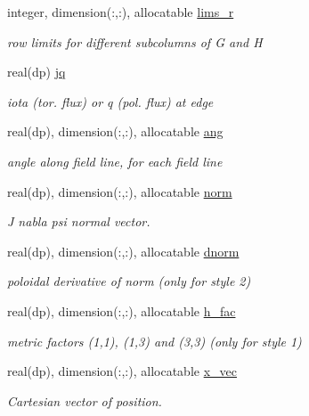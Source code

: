 \begin{DoxyCompactItemize}
integer, dimension(\+:,\+:), allocatable \hyperlink{structvac__vars_1_1vac__type_aac146dc17760b97ff3cb7966cd1b41f9}{lims\+\_\+r}
\begin{DoxyCompactList}\small\item\em row limits for different subcolumns of G and H \end{DoxyCompactList}\item 
real(dp) \hyperlink{structvac__vars_1_1vac__type_a8cba6ae0e61249966161e44ab1c465fb}{jq}
\begin{DoxyCompactList}\small\item\em iota (tor. flux) or q (pol. flux) at edge \end{DoxyCompactList}\item 
real(dp), dimension(\+:,\+:), allocatable \hyperlink{structvac__vars_1_1vac__type_a8a79c1f2b383fda22b5f3cca1f7afd31}{ang}
\begin{DoxyCompactList}\small\item\em angle along field line, for each field line \end{DoxyCompactList}\item 
real(dp), dimension(\+:,\+:), allocatable \hyperlink{structvac__vars_1_1vac__type_a0a50780974a5360abbc019e2e32f82ec}{norm}
\begin{DoxyCompactList}\small\item\em J nabla psi normal vector. \end{DoxyCompactList}\item 
real(dp), dimension(\+:,\+:), allocatable \hyperlink{structvac__vars_1_1vac__type_a7703921b8900d9886904fd51e8cba073}{dnorm}
\begin{DoxyCompactList}\small\item\em poloidal derivative of norm (only for style 2) \end{DoxyCompactList}\item 
real(dp), dimension(\+:,\+:), allocatable \hyperlink{structvac__vars_1_1vac__type_abdbf97da81162577af6880aba4e44061}{h\+\_\+fac}
\begin{DoxyCompactList}\small\item\em metric factors (1,1), (1,3) and (3,3) (only for style 1) \end{DoxyCompactList}\item 
real(dp), dimension(\+:,\+:), allocatable \hyperlink{structvac__vars_1_1vac__type_ae485365ab16528f580d33805ba4633d3}{x\+\_\+vec}
\begin{DoxyCompactList}\small\item\em Cartesian vector of position. \end{DoxyCompactList}\item 

\end{DoxyCompactItemize}
